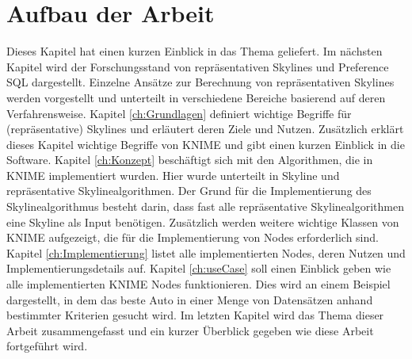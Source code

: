 \section{Aufbau der Arbeit}
\label{ch:Einleitung:sec:Gliederung}
Dieses Kapitel hat einen kurzen Einblick in das Thema geliefert. Im nächsten Kapitel wird der Forschungsstand von repräsentativen Skylines und Preference SQL dargestellt. Einzelne Ansätze zur Berechnung von repräsentativen Skylines werden vorgestellt und unterteilt in verschiedene Bereiche basierend auf deren Verfahrensweise. 
Kapitel \ref{ch:Grundlagen} definiert wichtige Begriffe für (repräsentative) Skylines und erläutert deren Ziele und Nutzen. Zusätzlich erklärt dieses Kapitel wichtige Begriffe von KNIME und gibt einen kurzen Einblick in die Software.
Kapitel \ref{ch:Konzept} beschäftigt sich mit den Algorithmen, die in KNIME implementiert wurden. Hier wurde unterteilt in Skyline und repräsentative Skylinealgorithmen. Der Grund für die Implementierung des Skylinealgorithmus besteht darin, dass fast alle repräsentative Skylinealgorithmen eine Skyline als Input benötigen. Zusätzlich werden weitere wichtige Klassen von KNIME aufgezeigt, die für die Implementierung von Nodes erforderlich sind. Kapitel \ref{ch:Implementierung} listet alle implementierten Nodes, deren Nutzen und Implementierungsdetails auf.
Kapitel \ref{ch:useCase} soll einen Einblick geben wie alle implementierten KNIME Nodes funktionieren. Dies wird an einem Beispiel dargestellt, in dem das beste Auto in einer Menge von Datensätzen anhand bestimmter Kriterien gesucht wird. Im letzten Kapitel wird das Thema dieser Arbeit zusammengefasst und ein kurzer Überblick gegeben wie diese Arbeit fortgeführt wird.
